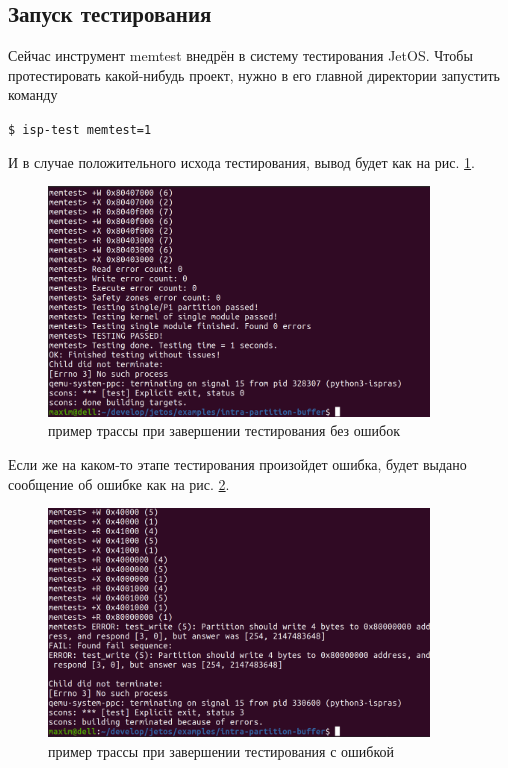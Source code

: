 \documentclass[oneside,senior,etd]{BYUPhys}
\begin{document}
\subsection{Запуск тестирования}

Сейчас инструмент memtest внедрён в систему тестирования JetOS. Чтобы протестировать
какой-нибудь проект, нужно в его главной директории запустить команду

\texttt{\$ isp-test memtest=1}

И в случае положительного исхода тестирования, вывод будет как на рис. \ref{correct_test}.

\begin{figure}[t]
  \centering
  \includegraphics[width=0.9\textwidth]{./correct_test.png}
  \caption{пример трассы при завершении тестирования без ошибок}
  \label{correct_test}
\end{figure}

Если же на каком-то этапе тестирования произойдет ошибка, будет выдано сообщение
об ошибке как на рис. \ref{failed_test}.

\begin{figure}[t]
  \centering
  \includegraphics[width=0.9\textwidth]{./failed_test.png}
  \caption{пример трассы при завершении тестирования с ошибкой}
  \label{failed_test}
\end{figure}
\end{document}
